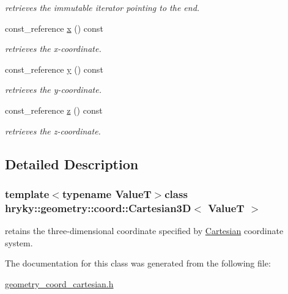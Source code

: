 \begin{DoxyCompactItemize}
\begin{DoxyCompactList}\small\item\em retrieves the immutable iterator pointing to the end. \end{DoxyCompactList}\item 
\hypertarget{classhryky_1_1geometry_1_1coord_1_1_cartesian3_d_a4dcd5b0cc85e0e3d4827bf552445c6c7}{const\-\_\-reference \hyperlink{classhryky_1_1geometry_1_1coord_1_1_cartesian3_d_a4dcd5b0cc85e0e3d4827bf552445c6c7}{x} () const }\label{classhryky_1_1geometry_1_1coord_1_1_cartesian3_d_a4dcd5b0cc85e0e3d4827bf552445c6c7}

\begin{DoxyCompactList}\small\item\em retrieves the x-\/coordinate. \end{DoxyCompactList}\item 
\hypertarget{classhryky_1_1geometry_1_1coord_1_1_cartesian3_d_ae56136dedbe50c752ca22a9fcd674ce3}{const\-\_\-reference \hyperlink{classhryky_1_1geometry_1_1coord_1_1_cartesian3_d_ae56136dedbe50c752ca22a9fcd674ce3}{y} () const }\label{classhryky_1_1geometry_1_1coord_1_1_cartesian3_d_ae56136dedbe50c752ca22a9fcd674ce3}

\begin{DoxyCompactList}\small\item\em retrieves the y-\/coordinate. \end{DoxyCompactList}\item 
\hypertarget{classhryky_1_1geometry_1_1coord_1_1_cartesian3_d_ae650aeb76f156baba297d8649dc3ff49}{const\-\_\-reference \hyperlink{classhryky_1_1geometry_1_1coord_1_1_cartesian3_d_ae650aeb76f156baba297d8649dc3ff49}{z} () const }\label{classhryky_1_1geometry_1_1coord_1_1_cartesian3_d_ae650aeb76f156baba297d8649dc3ff49}

\begin{DoxyCompactList}\small\item\em retrieves the z-\/coordinate. \end{DoxyCompactList}\end{DoxyCompactItemize}


\subsection{Detailed Description}
\subsubsection*{template$<$typename Value\-T$>$class hryky\-::geometry\-::coord\-::\-Cartesian3\-D$<$ Value\-T $>$}

retains the three-\/dimensional coordinate specified by \hyperlink{classhryky_1_1geometry_1_1coord_1_1_cartesian}{Cartesian} coordinate system. 

The documentation for this class was generated from the following file\-:\begin{DoxyCompactItemize}
\item 
\hyperlink{geometry__coord__cartesian_8h}{geometry\-\_\-coord\-\_\-cartesian.\-h}\end{DoxyCompactItemize}
